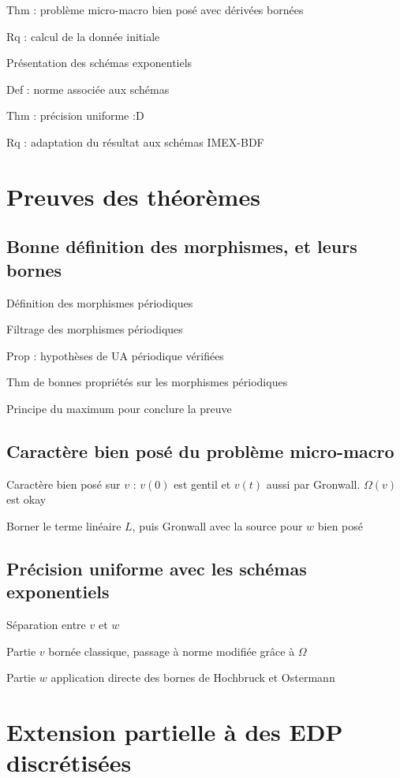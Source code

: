 Thm : problème micro-macro bien posé avec dérivées bornées

Rq : calcul de la donnée initiale

Présentation des schémas exponentiels

Def : norme associée aux schémas

Thm : précision uniforme :D

Rq : adaptation du résultat aux schémas IMEX-BDF


\section{Preuves des théorèmes}

\subsection{Bonne définition des morphismes, et leurs bornes}

Définition des morphismes périodiques

Filtrage des morphismes périodiques

Prop : hypothèses de UA périodique vérifiées

Thm de bonnes propriétés sur les morphismes périodiques

Principe du maximum pour conclure la preuve


\subsection{Caractère bien posé du problème micro-macro}

Caractère bien posé sur $v$ : $v(0)$ est gentil et $v(t)$ aussi par
Gronwall. $\Omega(v)$ est okay

Borner le terme linéaire $L$, puis Gronwall avec la source pour $w$ bien
posé


\subsection{Précision uniforme avec les schémas exponentiels}

Séparation entre $v$ et $w$

Partie $v$ bornée classique, passage à norme modifiée grâce à $\Omega$

Partie $w$ application directe des bornes de Hochbruck et Ostermann



\section{Extension partielle à des EDP discrétisées}

